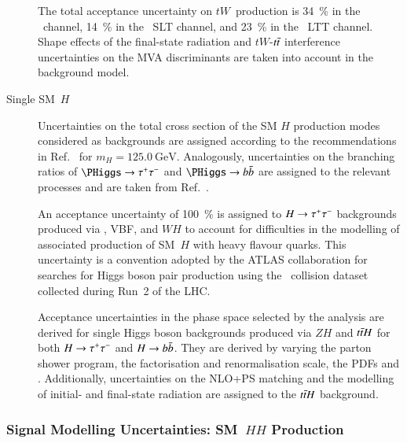 \begin{description}
  The total acceptance uncertainty on $tW$~production is \SI{34}{\percent} in
  the \hadhad~channel, \SI{14}{\percent} in the \lephad~SLT channel, and
  \SI{23}{\percent} in the \lephad~LTT channel. Shape effects of the final-state
  radiation and $tW$-$t\bar{t}$ interference uncertainties on the MVA
  discriminants are taken into account in the background model.

\item[Single SM~$H$] Uncertainties on the total cross section of the SM $H$
  production modes considered as backgrounds are assigned according to the
  recommendations in Ref.~\cite{deFlorian:2016spz_book} for
  $m_{H} = \SI{125.0}{\GeV}$. Analogously, uncertainties on the branching ratios
  of $\PHiggs \to \tautau$ and $\PHiggs \to \bbbar$ are assigned to the relevant
  processes and are taken from Ref.~\cite{deFlorian:2016spz_book}.

  An acceptance uncertainty of \SI{100}{\percent} is assigned to $H \to \tau^{+} \tau^{-}$
  backgrounds produced via \ggF, VBF, and $WH$ to account for difficulties in
  the modelling of associated production of SM~$H$ with heavy flavour
  quarks. This uncertainty is a convention adopted by the ATLAS collaboration
  for searches for Higgs boson pair production using the \pp~collision dataset
  collected during Run~2 of the LHC.

  Acceptance uncertainties in the phase space selected by the analysis are
  derived for single Higgs boson backgrounds produced via $ZH$ and $t\bar{t} H$
  for both $H \to \tau^{+} \tau^{-}$ and $H \to b\bar{b}$. They are derived by varying the
  parton shower program, the factorisation and renormalisation scale, the PDFs
  and \alphas. Additionally, uncertainties on the NLO+PS matching and the
  modelling of initial- and final-state radiation are assigned to the $t\bar{t} H$
  background.
\end{description}





\subsubsection{Signal Modelling Uncertainties: SM~$HH$ Production}

